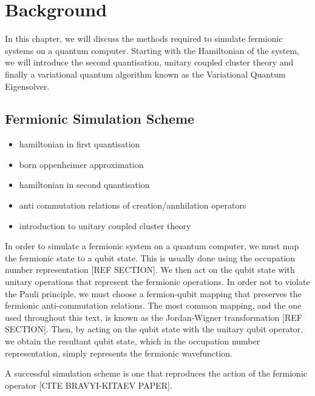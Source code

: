 \chapter{\label{background}Background}
In this chapter, we will discuss the methods required to simulate fermionic systems on a quantum computer. Starting with the Hamiltonian of the system, we will introduce the second quantisation, unitary coupled cluster theory and finally a variational quantum algorithm known as the Variational Quantum Eigensolver.

\section{Fermionic Simulation Scheme}

\begin{itemize}
    \item hamiltonian in first quantisation
    \item born oppenheimer approximation
    \item hamiltonian in second quantisation
    \item anti commutation relations of creation/annhilation operators
    \item introduction to unitary coupled cluster theory
\end{itemize}

In order to simulate a fermionic system on a quantum computer, we must map the fermionic state to a qubit state. This is usually done using the occupation number representation [REF SECTION]. We then act on the qubit state with unitary operations that represent the fermionic operations. In order not to violate the Pauli principle, we must choose a fermion-qubit mapping that preserves the fermionic anti-commutation relations. The most common mapping, and the one used throughout this text, is known as the Jordan-Wigner transformation [REF SECTION]. Then, by acting on the qubit state with the unitary qubit operator, we obtain the resultant qubit state, which in the occupation number representation, simply represents the fermionic wavefunction.

A successful simulation scheme is one that reproduces the action of the fermionic operator [CITE BRAVYI-KITAEV PAPER].

